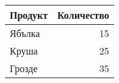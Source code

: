 \begin{tabular}{lr}
\toprule
Продукт & Количество \\
\midrule
Ябълка & 15 \\
Круша & 25 \\
Грозде & 35 \\
\bottomrule
\end{tabular}
